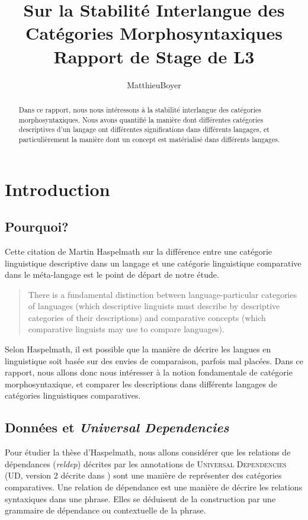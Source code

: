 \documentclass{cours}
\title{Sur la Stabilité Interlangue des Catégories Morphosyntaxiques\\ \small Rapport de Stage de L3}
\author{MatthieuBoyer}
\date{}
\begin{document}
\begin{abstract}
Dans ce rapport, nous nous intéressons à la stabilité interlangue des catégories morphosyntaxiques.
Nous avons quantifié la manière dont différentes catégories descriptives d'un langage ont différentes significations dans différents langages, et particulièrement la manière dont un concept est matérialisé dans différents langages.
\end{abstract}

\section{Introduction}
\subsection{Pourquoi?}
Cette citation de Martin Haspelmath sur la différence entre une catégorie linguistique descriptive dans un langage et une catégorie linguistique comparative dans le méta-langage est le point de départ de notre étude.

	\begin{quote}
	There is a fundamental distinction between language-particular categories of languages (which descriptive linguists must describe by descriptive categories of their descriptions) and comparative concepts (which comparative linguists may use to compare languages).
	{}
	\end{quote}

Selon Haspelmath, il est possible que la manière de décrire les langues en linguistique soit basée sur des envies de comparaison, parfois mal placées.
Dans ce rapport, nous allons donc nous intéresser à la notion fondamentale de catégorie morphosyntaxique, et comparer les descriptions dans différents langages de catégories linguistiques comparatives.

\subsection{Données et \emph{Universal Dependencies}}
Pour étudier la thèse d'Haspelmath, nous allons considérer que les relations de dépendances (\textit{reldep}) décrites par les annotations de \textsc{Universal Dependencies} (UD, version 2 décrite dans \cite{UDv2}) sont une manière de représenter des catégories comparatives.
Une relation de dépendance est une manière de décrire les relations syntaxiques dans une phrase.
Elles se déduisent de la construction par une grammaire de dépendance ou contextuelle de la phrase.
\end{document}
